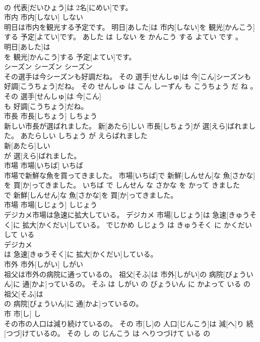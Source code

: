 \documentclass[8pt]{extreport}
\begin{document}
\begin{CJK}{UTF8}{min}
\\	の 代表[だいひょう]は 2名[にめい]です。			
\\	市内	市内[しない]	しない	
\\	明日は市内を観光する予定です。	明日[あした]は 市内[しない]を 観光[かんこう]する 予定[よてい]です。	あした は しない を かんこう する よてい です 。	
\\	明日[あした]は
\\	を 観光[かんこう]する 予定[よてい]です。			
\\	シーズン	シーズン	シーズン	
\\	その選手は今シーズンも好調だね。	その 選手[せんしゅ]は 今[こん]シーズンも 好調[こうちょう]だね。	その せんしゅ は こん しーずん も こうちょう だ ね 。	
\\	その 選手[せんしゅ]は 今[こん]
\\	も 好調[こうちょう]だね。			
\\	市長	市長[しちょう]	しちょう	
\\	新しい市長が選ばれました。	新[あたら]しい 市長[しちょう]が 選[えら]ばれました。	あたらしい しちょう が えらばれました	
\\	新[あたら]しい
\\	が 選[えら]ばれました。			
\\	市場	市場[いちば]	いちば	
\\	市場で新鮮な魚を買ってきました。	市場[いちば]で 新鮮[しんせん]な 魚[さかな]を 買[か]ってきました。	いちば で しんせん な さかな を かって きました	
\\	で 新鮮[しんせん]な 魚[さかな]を 買[か]ってきました。			
\\	市場	市場[しじょう]	しじょう	
\\	デジカメ市場は急速に拡大している。	デジカメ 市場[しじょう]は 急速[きゅうそく]に 拡大[かくだい]している。	でじかめ しじょう は きゅうそく に かくだい して いる	
\\	デジカメ
\\	は 急速[きゅうそく]に 拡大[かくだい]している。			
\\	市外	市外[しがい]	しがい	
\\	祖父は市外の病院に通っているの。	祖父[そふ]は 市外[しがい]の 病院[びょういん]に 通[かよ]っているの。	そふ は しがい の びょういん に かよって いる の	
\\	祖父[そふ]は
\\	の 病院[びょういん]に 通[かよ]っているの。			
\\	市	市[し]	し	
\\	その市の人口は減り続けているの。	その 市[し]の 人口[じんこう]は 減[へ]り 続[つづ]けているの。	その し の じんこう は へりつづけて いる の	

\end{CJK}
\end{document}

